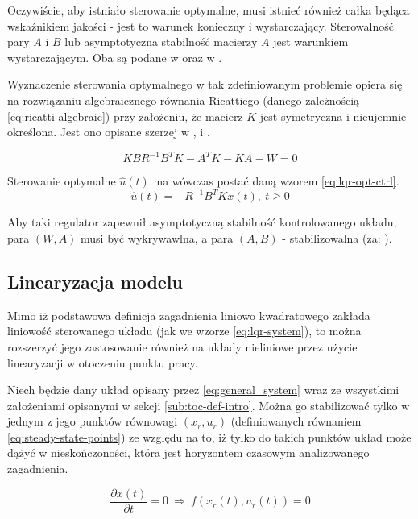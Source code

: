 Oczywiście, aby istniało sterowanie optymalne, musi istnieć również całka będąca wskaźnikiem jakości - jest to warunek konieczny i wystarczający. Sterowalność pary $A$ i $B$ lub asymptotyczna stabilność macierzy $A$ jest warunkiem wystarczającym. Oba są podane w \cite{Korytowski2015} oraz w \cite{AthansOptCtrl}.

Wyznaczenie sterowania optymalnego w tak zdefiniowanym problemie opiera się na rozwiązaniu algebraicznego równania Ricattiego (danego zależnością \ref{eq:ricatti-algebraic}) przy założeniu, że macierz $K$ jest symetryczna i nieujemnie określona. Jest ono opisane szerzej w \cite{AthansOptCtrl}, \cite{Korytowski2015} i \cite{Murray2006}.

\begin{equation}\label{eq:ricatti-algebraic}
KBR^{-1}B^{T}K - A^{T}K - KA - W =0
\end{equation}

Sterowanie optymalne $\hat{u}(t)$ ma wówczas postać daną wzorem \ref{eq:lqr-opt-ctrl}.
\begin{equation}\label{eq:lqr-opt-ctrl}
\hat{u}(t) = -R^{-1}B^{T}Kx(t),~ t \geq 0
\end{equation}

Aby taki regulator zapewnił asymptotyczną stabilność kontrolowanego układu, para $(W, A)$ musi być wykrywawlna, a para $(A, B)$ - stabilizowalna (za: \cite{Korytowski2015}).

\subsection{Linearyzacja modelu}
\label{sub:lqr-lin}

Mimo iż podstawowa definicja zagadnienia liniowo kwadratowego zakłada liniowość sterowanego układu (jak we wzorze \ref{eq:lqr-system}), to można rozszerzyć jego zastosowanie również na układy nieliniowe przez użycie linearyzacji w otoczeniu punktu pracy.

Niech będzie dany układ opisany przez \ref{eq:general_system} wraz ze wszystkimi założeniami opisanymi w sekcji \ref{sub:toc-def-intro}.
Można go stabilizować tylko w jednym z jego punktów równowagi $(x_{r}, u_{r})$ (definiowanych równaniem \ref{eq:steady-state-points}) ze względu na to, iż tylko do takich punktów układ może dążyć w nieskończoności, która jest horyzontem czasowym analizowanego zagadnienia.

\begin{equation}\label{eq:steady-state-points}
\frac{\partial x(t)}{\partial t} = 0 ~\Rightarrow~ f(x_{r}(t), u_{r}(t)) = 0
\end{equation}

